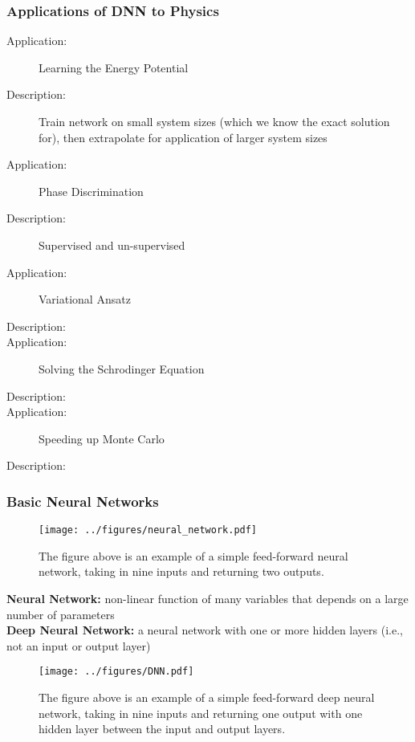 \subsubsection{Applications of DNN to Physics}
\begin{description}
\item [Application:] Learning the Energy Potential
\item [Description:] Train network on small system sizes (which we know the exact solution for), then extrapolate for application of larger system sizes 

\item [Application:] Phase Discrimination
\item [Description:] Supervised and un-supervised 

\item[Application:] Variational Ansatz 
\item[Description:] 

\item [Application:] Solving the Schrodinger Equation
\item[Description:] 

\item [Application:] Speeding up Monte Carlo
\item [Description:] 
\end{description}

\subsubsection{Basic Neural Networks}
\begin{figure}[H]
\centering
\texttt{[image: ../figures/neural\_network.pdf]}
\caption{The figure above is an example of a simple feed-forward neural network, taking in nine inputs and returning two outputs.}
\end{figure}

\noindent \textbf{Neural Network:} non-linear function of many variables that depends on a large number of parameters \\
\textbf{Deep Neural Network:} a neural network with one or more hidden layers (i.e., not an input or output layer)

\begin{figure}[H]
\centering
\texttt{[image: ../figures/DNN.pdf]}
\caption{The figure above is an example of a simple feed-forward deep neural network, taking in nine inputs and returning one output with one hidden layer between the input and output layers.}
\end{figure}
			

